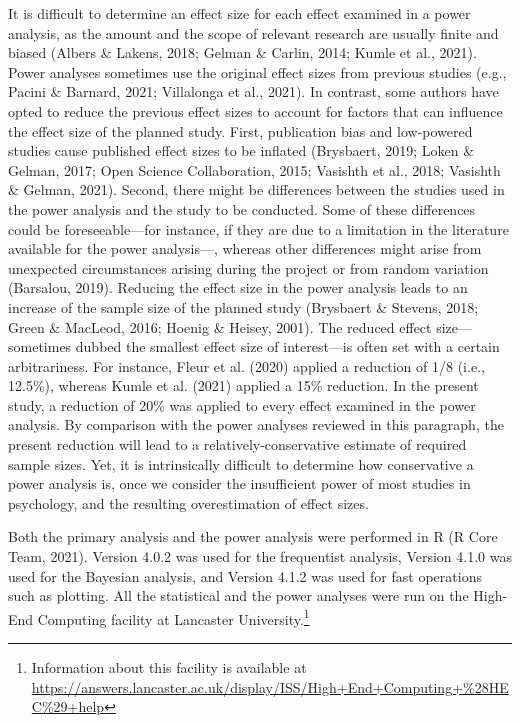 \documentclass[
  12pt,
  man,floatsintext]{apa7}
\begin{document}
It is difficult to determine an effect size for each effect examined in a power analysis, as the amount and the scope of relevant research are usually finite and biased (Albers \& Lakens, 2018; Gelman \& Carlin, 2014; Kumle et al., 2021). Power analyses sometimes use the original effect sizes from previous studies (e.g., Pacini \& Barnard, 2021; Villalonga et al., 2021). In contrast, some authors have opted to reduce the previous effect sizes to account for factors that can influence the effect size of the planned study. First, publication bias and low-powered studies cause published effect sizes to be inflated (Brysbaert, 2019; Loken \& Gelman, 2017; Open Science Collaboration, 2015; Vasishth et al., 2018; Vasishth \& Gelman, 2021). Second, there might be differences between the studies used in the power analysis and the study to be conducted. Some of these differences could be foreseeable---for instance, if they are due to a limitation in the literature available for the power analysis---, whereas other differences might arise from unexpected circumstances arising during the project or from random variation (Barsalou, 2019). Reducing the effect size in the power analysis leads to an increase of the sample size of the planned study (Brysbaert \& Stevens, 2018; Green \& MacLeod, 2016; Hoenig \& Heisey, 2001). The reduced effect size---sometimes dubbed the smallest effect size of interest---is often set with a certain arbitrariness. For instance, Fleur et al. (2020) applied a reduction of 1/8 (i.e., 12.5\%), whereas Kumle et al. (2021) applied a 15\% reduction. In the present study, a reduction of 20\% was applied to every effect examined in the power analysis. By comparison with the power analyses reviewed in this paragraph, the present reduction will lead to a relatively-conservative estimate of required sample sizes. Yet, it is intrinsically difficult to determine how conservative a power analysis is, once we consider the insufficient power of most studies in psychology, and the resulting overestimation of effect sizes.

Both the primary analysis and the power analysis were performed in R (R Core Team, 2021). Version 4.0.2 was used for the frequentist analysis, Version 4.1.0 was used for the Bayesian analysis, and Version 4.1.2 was used for fast operations such as plotting. All the statistical and the power analyses were run on the High-End Computing facility at Lancaster University.\footnote{Information about this facility is available at \url{https://answers.lancaster.ac.uk/display/ISS/High+End+Computing+\%28HEC\%29+help}}
\end{document}
